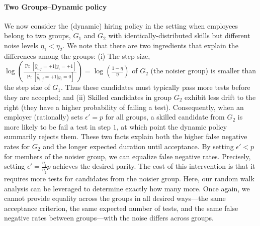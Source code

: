 \paragraph{Two Groups--Dynamic policy}
We now consider the (dynamic) hiring policy 
in the setting when employees belong to two groups, 
$G_1$ and $G_2$ with identically-distributed skills 
but different noise levels $\eta_1<\eta_2$.
We note that there are two ingredients 
that explain the differences among the groups:
(i) The step size, $\log \left(\frac{\Pr[\hat{y}_{i,j}=+1|y_i=+1]}{\Pr[\hat{y}_{i,j}=+1|y_i=0]}\right)=\log \left(\frac{1-\eta}{\eta} \right)$ of $G_2$ (the noisier group) 
is smaller than the step size of $G_1$. 
Thus these candidates must typically pass more tests 
before they are accepted;
and (ii)
Skilled candidates in group $G_2$ 
exhibit less drift to the right
(they have a higher probability of failing a test).
Consequently, when an employer (rationally)
sets $\epsilon' = p$ for all groups,
a skilled candidate from $G_2$ 
is more likely to be fail a test in step $1$,
at which point the dynamic policy summarily rejects them.
These two facts explain both the higher false negative rates for $G_2$ 
and the longer expected duration until acceptance.
By setting $\epsilon' < p$ for members of the noisier group, we can equalize false negative rates.
Precisely, setting $\epsilon' = \frac{\eta_1}{\eta_2}p$
achieves the desired parity.
The cost of this intervention is that it requires more tests for candidates from the noisier group.
Here, our random walk analysis can be leveraged to determine exactly how many more.
Once again, we cannot provide equality across the groups in all desired ways---the 
same acceptance criterion, the same expected number of tests,
and the same false negative rates between groups---with the noise differs across groups.
